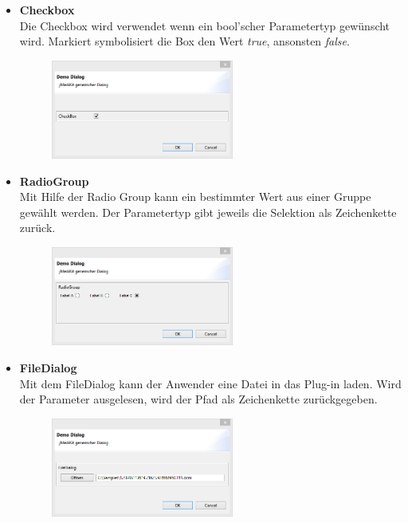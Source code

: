\begin{itemize}
\item \textbf{Checkbox}\\
Die Checkbox wird verwendet wenn ein bool'scher Parametertyp gewünscht wird. Markiert symbolisiert die Box den Wert \textit{true}, ansonsten \textit{false}.
\begin{figure}[H]
\includegraphics[angle=0,width=6cm]{./img/checkbox.png}
\end{figure}

\item \textbf{RadioGroup}\\
Mit Hilfe der Radio Group kann ein bestimmter Wert aus einer Gruppe gewählt werden. Der Parametertyp gibt jeweils die Selektion als Zeichenkette zurück.
\begin{figure}[H]
\includegraphics[angle=0,width=6cm]{./img/radiogroup.png}
\end{figure}

\item \textbf{FileDialog}\\
Mit dem FileDialog kann der Anwender eine Datei in das Plug-in laden. Wird der Parameter ausgelesen, wird der Pfad als Zeichenkette zurückgegeben.
\begin{figure}[H]
\includegraphics[angle=0,width=6cm]{./img/filedialog.png}
\end{figure}


\end{itemize}
